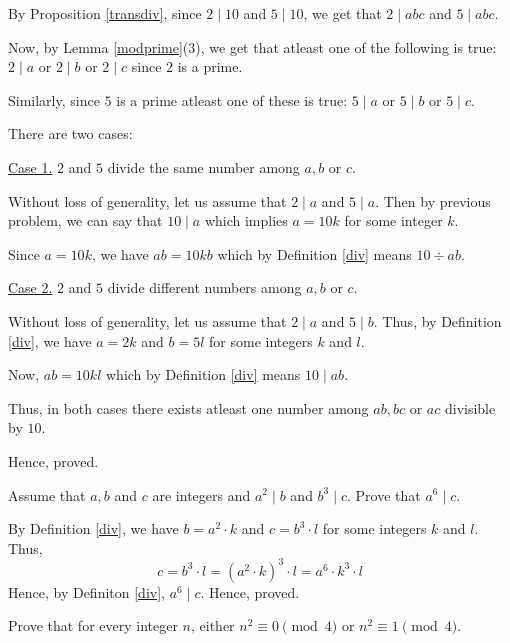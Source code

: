 \begin{solution}
	By Proposition \ref{transdiv}, since $2 \mid 10$ and $5 \mid 10$, we get that $2 \mid abc$ and $5 \mid abc$.

	Now, by Lemma \ref{modprime}(3), we get that atleast one of the following is true: $2 \mid a$ or $2 \mid b$ or $2 \mid c$ since $2$ is a prime.

	Similarly, since $5$ is a prime atleast one of these is true: $5 \mid a$ or $5 \mid b$ or $5 \mid c$.

	There are two cases:
	
	\underline{Case 1.} $2$ and $5$ divide the same number among $a, b$ or $c$.

	Without loss of generality, let us assume that $2 \mid a$ and $5 \mid a$. Then by previous problem, we can say that $10 \mid a$ which implies $a = 10k$ for some integer $k$.
	
	Since $a = 10k$, we have $ab = 10kb$ which by Definition \ref{div} means $10 \div ab$. 

	\underline{Case 2.} $2$ and $5$ divide different numbers among $a, b$ or $c$.

	Without loss of generality, let us assume that $2 \mid a$ and $5 \mid b$. Thus, by Definition \ref{div}, we have $a = 2k$ and $b = 5l$ for some integers $k$ and $l$.

	Now, $ab = 10kl$ which by Definition \ref{div} means $10 \mid ab$.

	Thus, in both cases there exists atleast one number among $ab, bc$ or $ac$ divisible by $10$.

	Hence, proved.
\end{solution}

\begin{problem}
	Assume that $a, b$ and $c$ are integers and $a^2 \mid b$ and $b^3 \mid c$. Prove that $a^6 \mid c$.
\end{problem}
\begin{solution}
	By Definition \ref{div}, we have $b = a^2 \cdot k$ and $c =  b^3 \cdot l$ for some integers $k$ and $l$. Thus,
	$$c = b^3 \cdot l = (a^2 \cdot k)^3 \cdot l = a^6 \cdot k^3 \cdot l$$
Hence, by Definiton \ref{div}, $a^6 \mid c$. Hence, proved.
\end{solution}

\begin{problem}
	Prove that for every integer $n$, either $n^2 \equiv 0 \pmod{4}$ or $n^2 \equiv 1 \pmod{4}$.
\end{problem}

